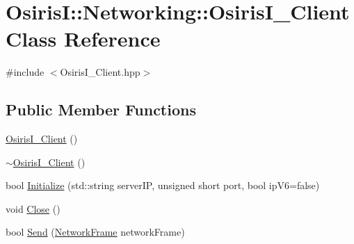 \hypertarget{class_osiris_i_1_1_networking_1_1_osiris_i___client}{\section{Osiris\-I\-:\-:Networking\-:\-:Osiris\-I\-\_\-\-Client Class Reference}
\label{class_osiris_i_1_1_networking_1_1_osiris_i___client}
}


{\ttfamily \#include $<$Osiris\-I\-\_\-\-Client.\-hpp$>$}

\subsection*{Public Member Functions}
\begin{DoxyCompactItemize}
\item 
\hyperlink{class_osiris_i_1_1_networking_1_1_osiris_i___client_a72c3e8ccc3cb35debd98f25eabf5bab5}{Osiris\-I\-\_\-\-Client} ()
\item 
\hyperlink{class_osiris_i_1_1_networking_1_1_osiris_i___client_a3b301ed1c2102655f392685bab7ad5d9}{$\sim$\-Osiris\-I\-\_\-\-Client} ()
\item 
bool \hyperlink{class_osiris_i_1_1_networking_1_1_osiris_i___client_a42c5f33a603c8961e28ad5c64fd1e603}{Initialize} (std\-::string server\-I\-P, unsigned short port, bool ip\-V6=false)
\item 
void \hyperlink{class_osiris_i_1_1_networking_1_1_osiris_i___client_a8b41736c16add34ca4a56bc3b6e32185}{Close} ()
\item 
bool \hyperlink{class_osiris_i_1_1_networking_1_1_osiris_i___client_aa7962728461acfa46e9d990b1aefd58d}{Send} (\hyperlink{struct_osiris_i_1_1_network_frame}{Network\-Frame} network\-Frame)
\end{DoxyCompactItemize}


